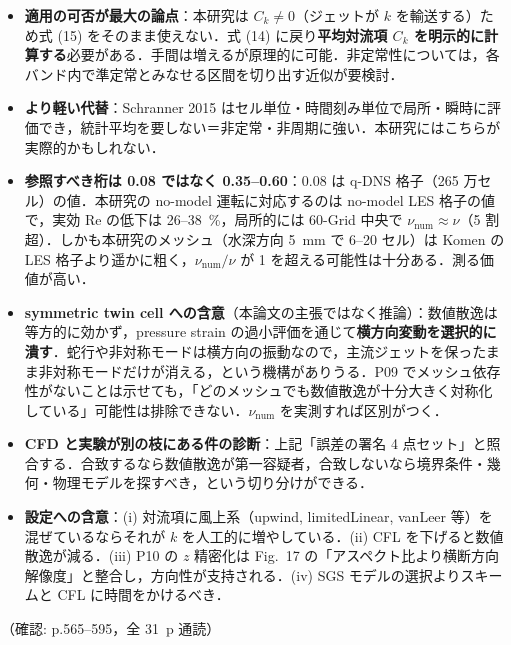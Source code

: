 \documentclass[11pt]{jsarticle}
\begin{document}
\begin{itemize}
  \begin{itemize}
    \item \textbf{適用の可否が最大の論点}：本研究は $C_k \neq 0$（ジェットが $k$ を輸送する）ため式 (15) をそのまま使えない．式 (14) に戻り\textbf{平均対流項 $C_k$ を明示的に計算する}必要がある．手間は増えるが原理的に可能．非定常性については，各バンド内で準定常とみなせる区間を切り出す近似が要検討．
    \item \textbf{より軽い代替}：Schranner 2015 はセル単位・時間刻み単位で局所・瞬時に評価でき，統計平均を要しない＝非定常・非周期に強い．本研究にはこちらが実際的かもしれない．
    \item \textbf{参照すべき桁は 0.08 ではなく 0.35--0.60}：0.08 は q-DNS 格子（265 万セル）の値．本研究の no-model 運転に対応するのは no-model LES 格子の値で，実効 Re の低下は 26--38~\%，局所的には 60-Grid 中央で $\nu_\mathrm{num} \approx \nu$（5 割超）．しかも本研究のメッシュ（水深方向 5~mm で 6--20 セル）は Komen の LES 格子より遥かに粗く，$\nu_\mathrm{num}/\nu$ が 1 を超える可能性は十分ある．測る価値が高い．
    \item \textbf{symmetric twin cell への含意}（本論文の主張ではなく推論）：数値散逸は等方的に効かず，pressure strain の過小評価を通じて\textbf{横方向変動を選択的に潰す}．蛇行や非対称モードは横方向の振動なので，主流ジェットを保ったまま非対称モードだけが消える，という機構がありうる．P09 でメッシュ依存性がないことは示せても，「どのメッシュでも数値散逸が十分大きく対称化している」可能性は排除できない．$\nu_\mathrm{num}$ を実測すれば区別がつく．
    \item \textbf{CFD と実験が別の枝にある件の診断}：上記「誤差の署名 4 点セット」と照合する．合致するなら数値散逸が第一容疑者，合致しないなら境界条件・幾何・物理モデルを探すべき，という切り分けができる．
    \item \textbf{設定への含意}：(i) 対流項に風上系（upwind, limitedLinear, vanLeer 等）を混ぜているならそれが $k$ を人工的に増やしている．(ii) CFL を下げると数値散逸が減る．(iii) P10 の $z$ 精密化は Fig.~17 の「アスペクト比より横断方向解像度」と整合し，方向性が支持される．(iv) SGS モデルの選択よりスキームと CFL に時間をかけるべき．
  \end{itemize}
\end{itemize}
\noindent（確認: p.565--595，全 31~p 通読）
\end{document}
